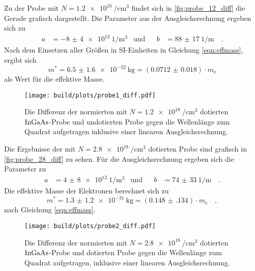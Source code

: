     \noindent Zu der Probe mit $N = \SI{1.2e18}{\per\centi\metre\tothe{3}}$ findet sich in \autoref{fig:probe_12_diff} die Gerade grafisch dargestellt. 
    Die Parameter aus der Ausgleichsrechnung ergeben sich zu 
    \begin{align*}
        a &= \SI{-8(4)e12}{1\per\metre\tothe{3}} & \text{und} & & b &= \SI{88(17)}{1\per\metre}\quad .
    \end{align*}
    Nach dem Einsetzen aller Größen in SI-Einheiten in Gleichung \eqref{eqn:effmass}, ergibt sich 
    \begin{equation*}
        m^* = \SI{6.5(16)e-32}{\kilo\gram} = \left(\num{0.0712(180)}\right)\cdot m_\text{e}
    \end{equation*}
    als Wert für die effektive Masse. 

    \begin{figure}[H]
        \centering
        \texttt{[image: build/plots/probe1\_diff.pdf]}
        \caption{Die Differenz der normierten mit $N = \SI{1.2e18}{\per\centi\metre\tothe{3}}$ dotierten $\ce{InGaAs}$-Probe und undotierten Probe gegen 
        die Wellenlänge zum Quadrat aufgetragen inklusive einer linearen Ausgleichsrechnung.}
        \label{fig:probe_12_diff}
    \end{figure}

    \noindent Die Ergebnisse der mit $N = \SI{2.8e18}{\per\centi\metre\tothe{3}}$ dotierten Probe sind grafisch in \autoref{fig:probe_28_diff} zu sehen. 
    Für die Ausgleichsrechnung ergeben sich die Parameter zu 
    \begin{align*}
        a &= \SI{4(8)e12}{1\per\metre\tothe{3}} & \text{und} & & b &= \SI{74(33)}{1\per\metre}\quad .
    \end{align*}
    Die effektive Masse der Elektronen berechnet sich zu 
    \begin{equation*}
        m^* = \SI{1.3(12)e-31}{\kilo\gram} = \left(\num{0.148(134)}\right)\cdot m_\text{e} \quad ,
    \end{equation*}
    nach Gleichung \eqref{eqn:effmass}.

    \begin{figure}[H]
        \centering
        \texttt{[image: build/plots/probe2\_diff.pdf]}
        \caption{Die Differenz der normierten mit $N = \SI{2.8e18}{\per\centi\metre\tothe{3}}$ dotierten $\ce{InGaAs}$-Probe und dotierten Probe gegen 
        die Wellenlänge zum Quadrat aufgetragen, inklusive einer linearen Ausgleichsrechnung.}
        \label{fig:probe_28_diff}
    \end{figure}